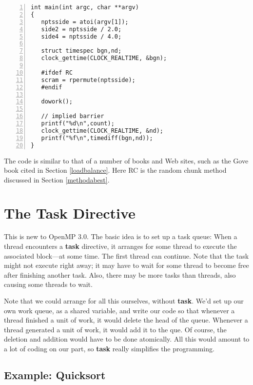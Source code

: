 \begin{lstlisting}[numbers=left]
int main(int argc, char **argv)
{
   nptsside = atoi(argv[1]);
   side2 = nptsside / 2.0;
   side4 = nptsside / 4.0;

   struct timespec bgn,nd;
   clock_gettime(CLOCK_REALTIME, &bgn);

   #ifdef RC
   scram = rpermute(nptsside);
   #endif

   dowork();

   // implied barrier
   printf("%d\n",count);
   clock_gettime(CLOCK_REALTIME, &nd);
   printf("%f\n",timediff(bgn,nd));
}
\end{lstlisting}

The code is similar to that of a number of books and Web sites, such as
the Gove book cited in Section \ref{loadbalance}.  Here RC is the random
chunk method discussed in Section \ref{methodabest}.

\section{The Task Directive}
\label{taskdir}

This is new to OpenMP 3.0.  The basic idea is to set up a task queue:
When a thread encounters a {\bf task} directive, it arranges for some
thread to execute the associated block---at some time.  The first thread
can continue.  Note that the task might not execute right away; it may
have to wait for some thread to become free after finishing another
task.  Also, there may be more tasks than threads, also causing some
threads to wait.

Note that we could arrange for all this ourselves, without {\bf task}.
We'd set up our own work queue, as a shared variable, and write our code
so that whenever a thread finished a unit of work, it would delete the
head of the queue.  Whenever a thread generated a unit of work, it would
add it to the que.  Of course, the deletion and addition would have to
be done atomically.  All this would amount to a lot of coding on our
part, so {\bf task} really simplifies the programming.

\subsection{Example:  Quicksort}

